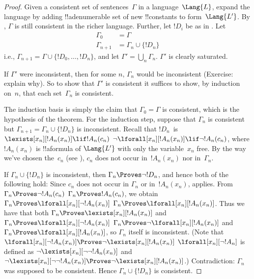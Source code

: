 \documentclass[../../../include/open-logic-section]{subfiles}
\begin{document}
\begin{proof}
Given a consistent set of sentences~$\Gamma$ in a language~$\Lang{L}$,
expand the language by adding !!a{denumerable} set of new
!!{constant}s to form~$\Lang{L'}$.  By , $\Gamma$
is still consistent in the richer language.  Further, let $!D_i$ be as
in .  Let
\begin{align*}
\Gamma_0 & = \Gamma \\
\Gamma_{n+1} & = \Gamma_n \cup \{!D_n \}
\end{align*}
i.e., $\Gamma_{n+1} = \Gamma \cup \{ !D_0, \dots, !D_n \}$, and let
$\Gamma' = \bigcup_{n} \Gamma_n$.  $\Gamma'$ is clearly saturated.

If $\Gamma'$ were inconsistent, then for some $n$, $\Gamma_n$ would be
inconsistent (Exercise: explain why).  So to show that $\Gamma'$ is
consistent it suffices to show, by induction on~$n$, that each
set~$\Gamma_n$ is consistent.

The induction basis is simply the claim that $\Gamma_0 = \Gamma$ is
consistent, which is the hypothesis of the theorem.  For the induction
step, suppose that $\Gamma_{n}$ is consistent but $\Gamma_{n+1} =
\Gamma_n \cup \{!D_n\}$ is inconsistent.  Recall that $!D_n$~is
{$\lexists[x_{n}][!A_{n}(x_n)] \lif !A_{n}(c_{n})$}
{$\lnot\lforall[x_{n}][!A_{n}(x_n)] \lif \lnot !A_{n}(c_{n})$},
where $!A_n(x_n)$ is !!a{formula} of $\Lang{L'}$ with only the
variable~$x_n$ free. By the way we've chosen the~$c_n$ (see
), $c_n$ does not occur in~$!A_n(x_n)$ nor
in~$\Gamma_n$.

If $\Gamma_n \cup \{!D_n\}$ is inconsistent, then $\Gamma_n
\Proves \lnot !D_n$, and hence both of the following hold:
Since $c_n$ does not occur in
$\Gamma_n$ or in~$!A_n(x_n)$, 
 applies.
From 
{$\Gamma_n \Proves \lnot !A_n(c_n)$}
{$\Gamma_n \Proves !A_n(c_n)$},
we obtain
{$\Gamma_n \Proves \lforall[x_n][\lnot !A_n(x_n)]$}
{$\Gamma_n \Proves \lforall[x_n][!A_n(x_n)]$}.
Thus we have that both
{$\Gamma_n \Proves \lexists[x_n][!A_n(x_n)]$ and
$\Gamma_n \Proves \lforall[x_n][\lnot !A_n(x_n)]$}
{$\Gamma_n \Proves \lnot\lforall[x_n][!A_n(x_n)]$ and
$\Gamma_n \Proves \lforall[x_n][!A_n(x_n)]$},
so $\Gamma_n$ itself is inconsistent.
{(Note that
{$\lforall[x_n][\lnot !A_n(x_n)] \Proves
  \lnot\lexists[x_n][!A_n(x_n)]$}
{$\lforall[x_n][\lnot !A_n]$ is defined as
  $\lnot\lexists[x_n][\lnot\lnot !A_n(x_n)]$ and
  $\lnot\lexists[x_n][\lnot\lnot !A_n(x_n)] \Proves
  \lnot\lexists[x_n][!A_n(x_n)]$}.)}{}
Contradiction: $\Gamma_n$ was supposed to be consistent.  Hence
$\Gamma_n \cup \{ !D_n\}$ is consistent.
\end{proof}
\end{document}
